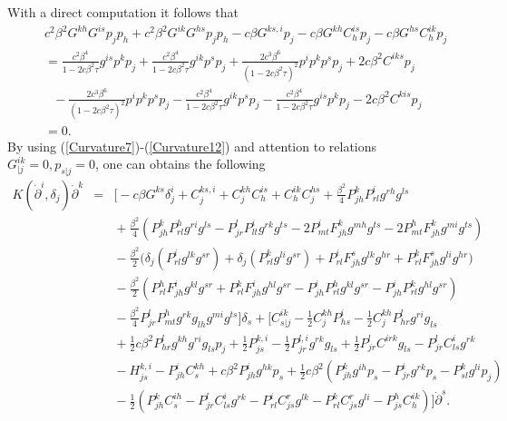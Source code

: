 \documentclass[10pt,a4paper]{article}
\theoremstyle{plain}
\theoremstyle{definition}
\begin{document}
With a direct computation it follows that
\begin{eqnarray}
&&c^2\beta^2G^{kh}G^{is}p_jp_h+c^2\beta^2G^{ik}G^{hs}p_jp_h-c\beta
G^{ks,i}p_j-c\beta G^{kh}C^{is}_hp_j-c\beta
G^{hs}C^{ik}_hp_j\nonumber\\
&&=\frac{c^2\beta^4}{1-2c\beta^2\tau}g^{is}p^kp_j+\frac{c^2\beta^4}{1-2c\beta^2\tau}g^{ik}p^sp_j
+\frac{2c^3\beta^6}{(1-2c\beta^2\tau)^2}p^ip^kp^sp_j+2c\beta^2C^{iks}p_j\nonumber\\
&&\ \ \
-\frac{2c^3\beta^6}{(1-2c\beta^2\tau)^2}p^ip^kp^sp_j-\frac{c^2\beta^4}{1-2c\beta^2\tau}g^{ik}p^sp_j-\frac{c^2\beta^4}{1-2c\beta^2\tau}g^{is}p^kp_j-2c\beta^2
C^{kis}p_j\nonumber\\
&&=0.\label{Curvature12}
\end{eqnarray}
By using (\ref{Curvature7})-(\ref{Curvature12}) and attention to
relations $G^{ik}_{|j}=0, p_{s|j}=0$, one can obtains the following
\begin{eqnarray}
K({\dot{\partial}}^i,\delta_j){\dot{\partial}}^k\!\!\!\!&=&\!\!\!\!\Big[-c\beta
G^{ks}\delta^i_j+C^{ks,i}_j+C^{kh}_jC^{is}_h+C^{ik}_hC^{hs}_j+\frac{\beta^2}{4}P^k_{jh}P^i_{rl}g^{rh}g^{ls}\nonumber\\
\!\!\!\!&&\!\!\!\!+\frac{\beta^2}{4}(P^k_{jh}P^h_{rl}g^{ri}g^{ls}
-P^l_{jr}P^i_{lt}g^{rk}g^{ts}-2P^i_{mt}F^k_{jh}g^{mh}g^{ts}-2P^h_{mt}F^k_{jh}g^{mi}g^{ts})\nonumber\\
\!\!\!\!&&\!\!\!\!-\frac{\beta^2}{2}\big(\delta_j(P^i_{rl}g^{lk}g^{sr})
+\delta_j(P^k_{rl}g^{li}g^{sr})+P^i_{rl}F^s_{jh}g^{lk}g^{hr}+P^k_{rl}F^s_{jh}g^{li}g^{hr}\big)\nonumber\\
\!\!\!\!&&\!\!\!\!-\frac{\beta^2}{2}(P^h_{rl}F^i_{jh}g^{kl}g^{sr}+P^k_{rl}F^i_{jh}g^{hl}g^{sr}
-P^i_{jh}P^h_{rl}g^{kl}g^{sr}-P^i_{jh}P^k_{rl}g^{hl}g^{sr})\nonumber\\
\!\!\!\!&&\!\!\!\!-\frac{\beta^2}{4}P^l_{jr}P^h_{mt}g^{rk}g_{lh}g^{mi}g^{ts}\Big]
\delta_s+\Big[C^{ik}_{s|j}-\frac{1}{2}C^{kh}_jP^i_{hs}-\frac{1}{2}C^{kh}_jP^l_{hr}g^{ri}g_{ls}\nonumber\\
\!\!\!\!&&\!\!\!\!  +\frac{1}{2}c\beta^2P^l_{hr}g^{kh}g^{ri}g_{ls}p_j+\frac{1}{2}P^{k,i}_{js}-\frac{1}{2}P^{l,i}_{jr}g^{rk}g_{ls}
+\frac{1}{2}P^l_{jr}C^{irk}g_{ls}
-P^l_{jr}C^i_{ls}g^{rk}\nonumber\\
\!\!\!\!&&\!\!\!\!-H^{k,i}_{js}-P^i_{jh}C^{kh}_s+c\beta^2P^i_{jh}g^{hk}p_s+
\frac{1}{2}c\beta^2(P^k_{jh}g^{ih}p_s-P^i_{jr}g^{rk}p_s-P^k_{sl}g^{li}p_j)
\nonumber\\\!\!\!\!&&\!\!\!\!
-\frac{1}{2}(P^k_{jh}C^{ih}_s-P^l_{jr}C^i_{ls}g^{rk}-P^i_{rl}C^r_{js}g^{lk}-P^k_{rl}C^r_{js}g^{li}
-P^h_{js}C^{ik}_h)\Big]{\dot{\partial}}^s.\label{curvature13}
\end{eqnarray}
\end{document}
